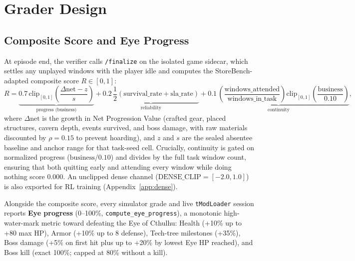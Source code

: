 \documentclass[10pt,letterpaper]{article}
\begin{document}
\section{Grader Design}

\subsection{Composite Score and Eye Progress}
At episode end, the verifier calls \texttt{/finalize} on the isolated game sidecar, which settles any unplayed windows with the player idle and computes the StoreBench-adapted composite score $R \in [0, 1]$:
\begin{equation}
  R = \underbrace{0.7\,\mathrm{clip}_{[0,1]}\!\left(\frac{\Delta\mathrm{net} - z}{s}\right)}_{\text{progress (business)}}
    + \underbrace{0.2\,\frac{1}{2}\!\left(\text{survival\_rate} + \text{sla\_rate}\right)}_{\text{reliability}}
    + \underbrace{0.1\,\left(\frac{\text{windows\_attended}}{\text{windows\_in\_task}}\right)\mathrm{clip}_{[0,1]}\!\left(\frac{\text{business}}{0.10}\right)}_{\text{continuity}},
  \label{eq:composite}
\end{equation}
where $\Delta\mathrm{net}$ is the growth in Net Progression Value (crafted gear, placed structures, cavern depth, events survived, and boss damage, with raw materials discounted by $\rho = 0.15$ to prevent hoarding), and $z$ and $s$ are the sealed absentee baseline and anchor range for that task-seed cell. Crucially, continuity is gated on normalized progress ($\text{business} / 0.10$) and divides by the full task window count, ensuring that both quitting early and attending every window while doing nothing score $0.000$. An unclipped dense channel ($\text{DENSE\_CLIP} = [-2.0, 1.0]$) is also exported for RL training (Appendix~\ref{app:dense}).

Alongside the composite score, every simulator grade and live \texttt{tModLoader} session reports \textbf{Eye progress} (0--100\%, \texttt{compute\_eye\_progress}), a monotonic high-water-mark metric toward defeating the Eye of Cthulhu: Health (+10\% up to +80 max HP), Armor (+10\% up to 8 defense), Tech-tree milestones (+35\%), Boss damage (+5\% on first hit plus up to +20\% by lowest Eye HP reached), and Boss kill (exact 100\%; capped at 80\% without a kill).
\end{document}
